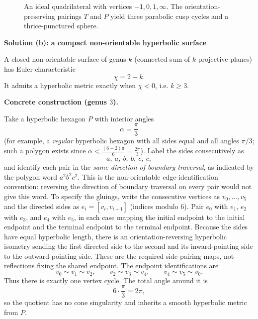 \begin{solution}
\begin{figure}[htbp]
		\caption{An ideal quadrilateral with vertices $-1,0,1,\infty$.  The orientation-preserving pairings $T$ and $P$ yield three parabolic cusp cycles and a thrice-punctured sphere.}
	\end{figure}
	
	\par\medskip\noindent\textbf{Solution (b): a compact non-orientable hyperbolic surface}\par\smallskip

	A closed non-orientable surface of genus $k$ (connected sum of $k$ projective planes) has Euler characteristic
	\[
	\chi = 2-k.
	\]
	It admits a hyperbolic metric exactly when $\chi<0$, i.e. $k\ge 3$.
	
	\par\medskip\noindent\textbf{Concrete construction (genus $3$).}\par\smallskip

	Take a hyperbolic hexagon $P$ with interior angles
	\[
	\alpha=\frac{\pi}{3}
	\]
	(for example, a \emph{regular} hyperbolic hexagon with all sides equal and all angles $\pi/3$; such a polygon exists since
	$\alpha<\frac{(6-2)\pi}{6}=\frac{2\pi}{3}$).
	Label the sides consecutively as
	\[
	a,\ a,\ b,\ b,\ c,\ c,
	\]
	and identify each pair in the \emph{same direction of boundary traversal},
	as indicated by the polygon word $a^2b^2c^2$.  This is the
	non-orientable edge-identification convention: reversing the direction
	of boundary traversal on every pair would not give this word.
	To specify the gluings, write the consecutive vertices as
	$v_0,\ldots,v_5$ and the directed sides as
	$e_i=[v_i,v_{i+1}]$ (indices modulo $6$).
	Pair $e_0$ with $e_1$, $e_2$ with $e_3$, and $e_4$ with $e_5$,
	in each case mapping the initial endpoint to the initial endpoint
	and the terminal endpoint to the terminal endpoint.
	Because the sides have equal hyperbolic length, there is an
	orientation-reversing hyperbolic isometry sending the first directed
	side to the second and its inward-pointing side to the outward-pointing
	side. These are the required side-pairing maps, not reflections fixing
	the shared endpoint.
	The endpoint identifications are
	\[
	 v_0\sim v_1\sim v_2,\qquad
	 v_2\sim v_3\sim v_4,\qquad
	 v_4\sim v_5\sim v_0.
	\]
	Thus there is exactly one vertex cycle. The total angle around it is
	\[
	6\cdot \frac{\pi}{3}=2\pi,
	\]
	so the quotient has no cone singularity and inherits a smooth hyperbolic metric from $P$.
	

\end{solution}
